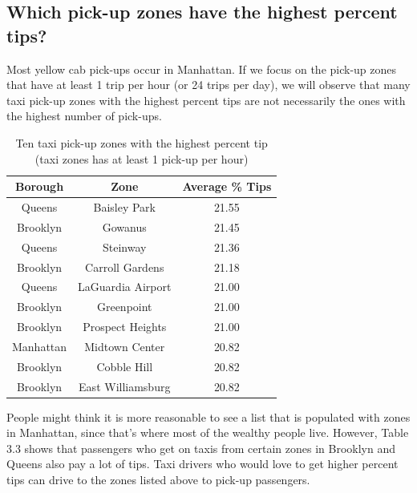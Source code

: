\documentclass[12pt,twoside]{reedthesis}
\theoremstyle{definition}
\theoremstyle{definition}
\theoremstyle{definition}
\theoremstyle{remark}
\begin{document}
\subsection{Which pick-up zones have the highest percent
tips?}\label{which-pick-up-zones-have-the-highest-percent-tips}

Most yellow cab pick-ups occur in Manhattan. If we focus on the pick-up
zones that have at least 1 trip per hour (or 24 trips per day), we will
observe that many taxi pick-up zones with the highest percent tips are
not necessarily the ones with the highest number of pick-ups.
\begin{table}

\caption{\label{tab:unnamed-chunk-44}Ten taxi pick-up zones with the highest percent tip (taxi zones has at least 1 pick-up per hour)}
\centering
\begin{tabular}[t]{ccc}
\toprule
Borough & Zone & Average \% Tips\\
\midrule
Queens & Baisley Park & 21.55\\
Brooklyn & Gowanus & 21.45\\
Queens & Steinway & 21.36\\
Brooklyn & Carroll Gardens & 21.18\\
Queens & LaGuardia Airport & 21.00\\
\addlinespace
Brooklyn & Greenpoint & 21.00\\
Brooklyn & Prospect Heights & 21.00\\
Manhattan & Midtown Center & 20.82\\
Brooklyn & Cobble Hill & 20.82\\
Brooklyn & East Williamsburg & 20.82\\
\bottomrule
\end{tabular}
\end{table}
People might think it is more reasonable to see a list that is populated
with zones in Manhattan, since that's where most of the wealthy people
live. However, Table 3.3 shows that passengers who get on taxis from
certain zones in Brooklyn and Queens also pay a lot of tips. Taxi
drivers who would love to get higher percent tips can drive to the zones
listed above to pick-up passengers.
\end{document}
